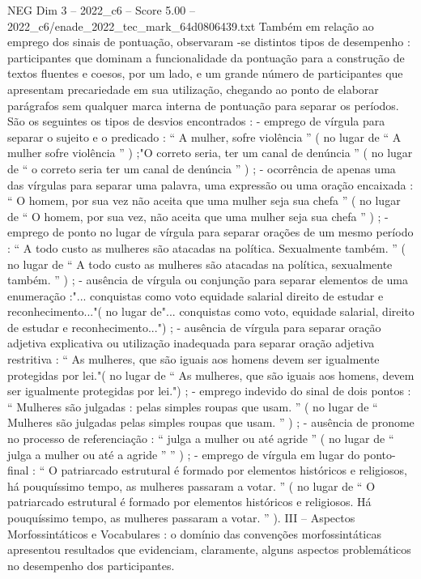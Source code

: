 \begin{textsample}{NEG Dim 3 – 2022\_c6 – Score 5.00 – 2022\_c6/enade\_2022\_tec\_mark\_64d0806439.txt}
Também em relação ao emprego dos sinais de pontuação, observaram -se distintos tipos de desempenho : participantes que dominam a funcionalidade da pontuação para a construção de textos fluentes e coesos, por um lado, e um grande número de participantes que apresentam precariedade em sua utilização, chegando ao ponto de elaborar parágrafos sem qualquer marca interna de pontuação para separar os períodos.
São os seguintes os tipos de desvios encontrados : - emprego de vírgula para separar o sujeito e o predicado : “ A mulher, sofre violência ” ( no lugar de “ A mulher sofre violência ” ) ;"O correto seria, ter um canal de denúncia ” ( no lugar de “ o correto seria ter um canal de denúncia ” ) ; - ocorrência de apenas uma das vírgulas para separar uma palavra, uma expressão ou uma oração encaixada : “ O homem, por sua vez não aceita que uma mulher seja sua chefa ” ( no lugar de “ O homem, por sua vez, não aceita que uma mulher seja sua chefa ” ) ; - emprego de ponto no lugar de vírgula para separar orações de um mesmo período : “ A todo custo as mulheres são atacadas na política.
Sexualmente também. ” ( no lugar de “ A todo custo as mulheres são atacadas na política, sexualmente também. ” ) ; - ausência de vírgula ou conjunção para separar elementos de uma enumeração :"... conquistas como voto equidade salarial direito de estudar e reconhecimento..."( no lugar de"... conquistas como voto, equidade salarial, direito de estudar e reconhecimento...") ; - ausência de vírgula para separar oração adjetiva explicativa ou utilização inadequada para separar oração adjetiva restritiva : “ As mulheres, que são iguais aos homens devem ser igualmente protegidas por lei."( no lugar de “ As mulheres, que são iguais aos homens, devem ser igualmente protegidas por lei.") ; - emprego indevido do sinal de dois pontos : “ Mulheres são julgadas : pelas simples roupas que usam. ” ( no lugar de “ Mulheres são julgadas pelas simples roupas que usam. ” ) ; - ausência de pronome no processo de referenciação : “ julga a mulher ou até agride ” ( no lugar de “ julga a mulher ou até a agride ” ” ) ; - emprego de vírgula em lugar do ponto-final : “ O patriarcado estrutural é formado por elementos históricos e religiosos, há pouquíssimo tempo, as mulheres passaram a votar. ” ( no lugar de “ O patriarcado estrutural é formado por elementos históricos e religiosos.
Há pouquíssimo tempo, as mulheres passaram a votar. ” ).
III – Aspectos Morfossintáticos e Vocabulares : o domínio das convenções morfossintáticas apresentou resultados que evidenciam, claramente, alguns aspectos problemáticos no desempenho dos participantes.

\end{textsample}
